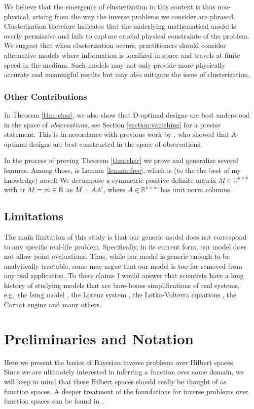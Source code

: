 \documentclass[ba]{imsart}
\newcommand{\ttr}[1]{\textup{tr}\ #1}
\theoremstyle{plain}
\theoremstyle{definition}
\theoremstyle{remark}
\begin{document}
We believe that the emergence of clusterization in this context is
thus non-physical, arising from the way the inverse problems we
consider are phrased. Clusterization therefore indicates that the
underlying mathematical model is overly permissive and fails to
capture crucial physical constraints of the problem. We suggest that
when clusterization occurs, practitioners should consider alternative
models where information is localized in space and travels at finite
speed in the medium. Such models may not only provide more physically
accurate and meaningful results but may also mitigate the issue of
clusterization.



\subsubsection{Other Contributions}
In Theorem \ref{thm:char}, we also show that D-optimal designs are
best understood in the space of \emph{observations}, see Section
\ref{section:vanishing} for a precise statement. This is in accordance
with previous work by \cite{koval2020}, who showed that A-optimal
designs are best constructed in the space of observations.

In the process of proving Theorem \ref{thm:char} we prove and
generalize several lemmas. Among those, is Lemma \ref{lemma:free},
which is (to the the best of my knowledge) novel: We decompose a
symmetric positive definite matrix \(M \in \mathbb{R}^{k \times k}\)
with \(\ttr M = m \in \mathbb{N}\) as \(M = AA^t\), where \(A\in
\mathbb{R}^{k \times m}\) has unit norm columns.


\subsection{Limitations}\label{subsec:limitations}
The main limitation of this study is that our generic model does not
correspond to any specific real-life problem. Specifically, in its
current form, our model does not allow point evaluations. Thus, while
our model is generic enough to be analytically tractable, some may
argue that our model is too far removed from any real application. To
these claims I would answer that scientists have a long history of
studying models that are bare-bones simplifications of real systems,
e.g.~the Ising model \cite{cipra1987}, the Lorenz system \cite{brin},
the Lotka-Volterra equations \cite{logan2006}, the Carnot engine
\cite{kardar2007} and many others.
 \section{Preliminaries and Notation}\label{section:prelim}
Here we present the basics of Bayesian inverse problems over Hilbert
spaces. Since we are ultimately interested in inferring a function
over some domain, we will keep in mind that these Hilbert spaces
should really be thought of as function spaces. A deeper treatment of
the foundations for inverse problems over function spaces can be found
in \cite{Stuart10}.
\end{document}
